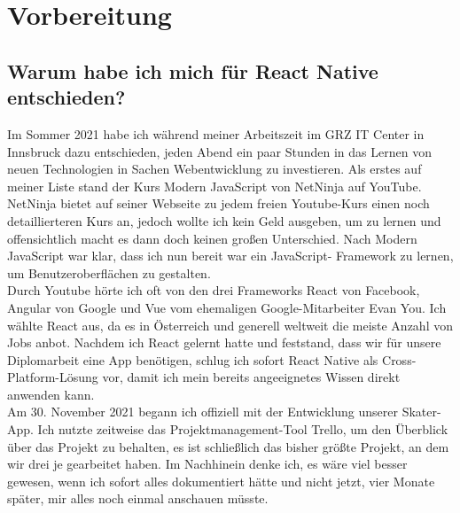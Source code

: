 \chapter{Vorbereitung}

\section{Warum habe ich mich für React Native entschieden?}
Im Sommer 2021 habe ich während meiner Arbeitszeit im GRZ IT Center in Innsbruck dazu entschieden,
jeden Abend ein paar Stunden in das Lernen von neuen Technologien in Sachen Webentwicklung zu
investieren. Als erstes auf meiner Liste stand der Kurs Modern JavaScript von NetNinja auf YouTube.
NetNinja bietet auf seiner Webseite zu jedem freien Youtube-Kurs einen noch detaillierteren Kurs an,
jedoch wollte ich kein Geld ausgeben, um zu lernen und offensichtlich macht es dann doch keinen
großen Unterschied. Nach Modern JavaScript war klar, dass ich nun bereit war ein JavaScript-
Framework zu lernen, um Benutzeroberflächen zu gestalten. \\

Durch Youtube hörte ich oft von den drei Frameworks React von Facebook, Angular von Google und Vue
vom ehemaligen Google-Mitarbeiter Evan You. Ich wählte React aus, da es in Österreich und generell
weltweit die meiste Anzahl von Jobs anbot. Nachdem ich React gelernt hatte und feststand, dass wir
für unsere Diplomarbeit eine App benötigen, schlug ich sofort React Native als Cross-Platform-Lösung
vor, damit ich mein bereits angeeignetes Wissen direkt anwenden kann. \\

Am 30. November 2021 begann ich offiziell mit der Entwicklung unserer Skater-App. Ich nutzte
zeitweise das Projektmanagement-Tool Trello, um den Überblick über das Projekt zu behalten, es ist
schließlich das bisher größte Projekt, an dem wir drei je gearbeitet haben. Im Nachhinein denke ich,
es wäre viel besser gewesen, wenn ich sofort alles dokumentiert hätte und nicht jetzt, vier Monate
später, mir alles noch einmal anschauen müsste.